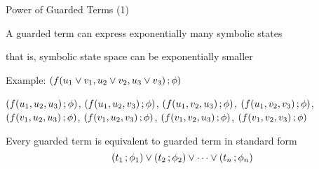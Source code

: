 \documentclass[11pt]{beamer}
\begin{document}
\begin{frame}{Power of Guarded Terms (1)}
\begin{outeritemize}
    \item A guarded term can express \alert{exponentially many}
      symbolic states
    
    \begin{inneritemize}
        \item that is, symbolic state space can be exponentially
          smaller
    \end{inneritemize}
    
    \pause
    \item Example: $\left( f(u_1 \vee v_1, u_2 \vee v_2, u_3 \vee v_3) \,; \phi \right)$
    
    \begin{inneritemize}
        \item $\left( f(u_1, u_2, u_3) \,; \phi \right)$, $\left( f(u_1, u_2, v_3) \,; \phi \right)$, $\left( f(u_1, v_2, u_3) \,; \phi \right)$, $\left( f(u_1, v_2, v_3) \,; \phi \right)$, $\left( f(v_1, u_2, u_3) \,; \phi \right)$, $\left( f(v_1, u_2, v_3) \,; \phi \right)$, $\left( f(v_1, v_2, u_3) \,; \phi \right)$, $\left( f(v_1, v_2, v_3) \,; \phi \right)$
    \end{inneritemize}

\pause
\vspace{1em}
\begin{theorem}\small
\label{thm:standard}
Every guarded term is equivalent to guarded term in \alert{standard form} 
\[
\left( t_1 \,; \phi_1 \right) \lor \left( t_2 \,; \phi_2 \right) \lor \cdots \lor \left( t_n \,; \phi_n \right)\]
\end{theorem}
\end{outeritemize}
\end{frame}
\end{document}
